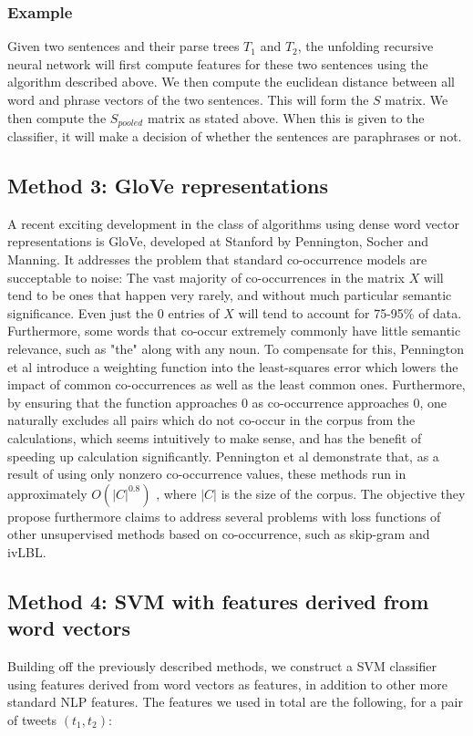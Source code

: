 \documentclass[conference]{IEEEtran}
\begin{document}
\subsubsection{Example}
Given two sentences and their parse trees $T_1$ and $T_2$, the unfolding recursive neural network will first compute features for these two sentences using the algorithm described above. We then compute the euclidean distance between all word and phrase vectors of the two sentences. This will form the $S$ matrix. We then compute the $S_{pooled}$ matrix as stated above. When this is given to the classifier, it will make a decision of whether the sentences are paraphrases or not.\\

\subsection{Method 3: GloVe representations}
A recent exciting development in the class of algorithms using dense word vector representations is GloVe, developed at Stanford by Pennington, Socher and Manning. It addresses the problem that standard co-occurrence models are succeptable to noise: The vast majority of co-occurrences in the matrix $X$ will tend to be ones that happen very rarely, and without much particular semantic significance. Even just the 0 entries of $X$ will tend to account for 75-95\% of data. Furthermore, some words that co-occur extremely commonly have little semantic relevance, such as "the" along with any noun. To compensate for this, Pennington et al introduce a weighting function into the least-squares error which lowers the impact of common co-occurrences as well as the least common ones. Furthermore, by ensuring that the function approaches 0 as co-occurrence approaches 0, one naturally excludes all pairs which do not co-occur in the corpus from the calculations, which seems intuitively to make sense, and has the benefit of speeding up calculation significantly. Pennington et al demonstrate that, as a result of using only nonzero co-occurrence values, these methods run in approximately $O(|C|^{0.8})$ , where $|C|$ is the size of the corpus. The objective they propose furthermore claims to address several problems with loss functions of other unsupervised methods based on co-occurrence, such as skip-gram and ivLBL. \cite{GloVe}\\

\subsection{Method 4: SVM with features derived from word vectors}
Building off the previously described methods, we construct a SVM classifier using features derived from word vectors as features, in addition to other more standard NLP features.  The features we used in total are the following, for a pair of tweets $(t_1, t_2)$:
\end{document}
